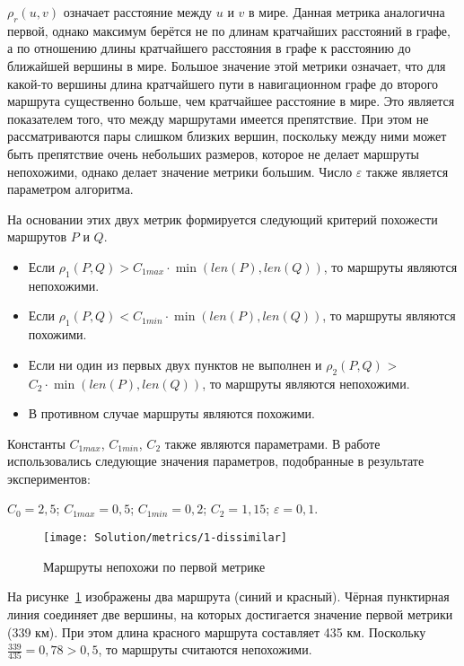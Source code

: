 $\rho_r(u, v)$ означает расстояние между $u$ и $v$ в мире. Данная
метрика аналогична первой, однако максимум берётся не по длинам
кратчайших расстояний в графе, а по отношению длины кратчайшего
расстояния в графе к расстоянию до ближайшей вершины в мире. Большое
значение этой метрики означает, что для какой-то вершины длина
кратчайшего пути в навигационном графе до второго маршрута существенно
больше, чем кратчайшее расстояние в мире. Это является показателем
того, что между маршрутами имеется препятствие. При этом не
рассматриваются пары слишком близких вершин, поскольку между ними
может быть препятствие очень небольших размеров, которое не делает
маршруты непохожими, однако делает значение метрики большим. Число
$\varepsilon$ также является параметром алгоритма.

На основании этих двух метрик формируется следующий критерий
похожести маршрутов $P$ и $Q$.
\begin{itemize}
  \item Если $\rho_1(P, Q) > C_{1max} \cdot \min(len(P), len(Q))$, то
    маршруты являются непохожими.
  \item Если $\rho_1(P, Q) < C_{1min} \cdot \min(len(P), len(Q))$, то
    маршруты являются похожими.
  \item Если ни один из первых двух пунктов не выполнен и $\rho_2(P,
    Q)$ > $C_2 \cdot \min(len(P), len(Q))$, то маршруты являются непохожими.

  \item В противном случае маршруты являются похожими.
\end{itemize}

Константы $C_{1max}$, $C_{1min}$, $C_2$ также являются параметрами. В
работе использовались следующие значения параметров, подобранные в
результате экспериментов:

$C_0 = 2,5$; $C_{1max} = 0,5$; $C_{1min} = 0,2$; $C_2 = 1,15$;
$\varepsilon = 0,1$.

\begin{figure}
    \texttt{[image: Solution/metrics/1-dissimilar]}
    \caption{Маршруты непохожи по первой метрике}
    \label{fig:1-dissimilar}
\end{figure}

На рисунке~\ref{fig:1-dissimilar} изображены два маршрута (синий и
красный). Чёрная пунктирная линия соединяет две вершины, на которых
достигается значение первой метрики (339 км). При этом длина красного
маршрута составляет 435 км. Поскольку $\frac{339}{435} = 0,78 > 0,5$,
то маршруты считаются непохожими.

